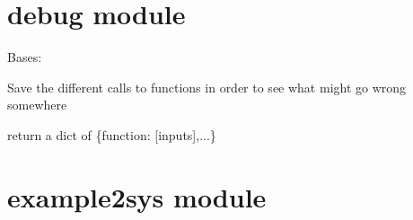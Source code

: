 \documentclass[letterpaper,10pt,english]{sphinxmanual}
\begin{document}
\chapter{debug module}
\label{debug:debug-module}\label{debug::doc}\label{debug:module-debug}

\begin{fulllineitems}
\label{debug:debug.InputOfCalls}
Bases: 

Save the different calls to functions in order to see what might go wrong somewhere

\begin{fulllineitems}
\label{debug:debug.InputOfCalls.inputs}
return a dict of \{function: {[}inputs{]},...\}

\end{fulllineitems}


\begin{fulllineitems}
\label{debug:debug.InputOfCalls.instances}
\end{fulllineitems}


\end{fulllineitems}



\chapter{example2sys module}
\label{example2sys:example2sys-module}\label{example2sys::doc}\label{example2sys:module-example2sys}

\begin{fulllineitems}
\label{example2sys:example2sys.example2sys}
\end{fulllineitems}

\end{document}

